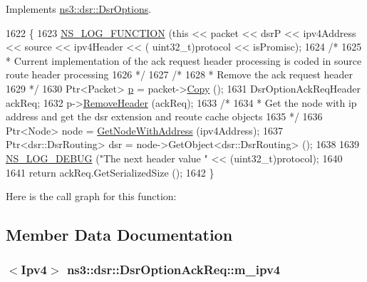 Implements \hyperlink{classns3_1_1dsr_1_1DsrOptions_ac34fb87a95464f3ea9d82ad12253a5cc}{ns3\+::dsr\+::\+Dsr\+Options}.


\begin{DoxyCode}
1622 \{
1623   \hyperlink{log-macros-disabled_8h_a90b90d5bad1f39cb1b64923ea94c0761}{NS\_LOG\_FUNCTION} (\textcolor{keyword}{this} << packet << dsrP << ipv4Address << source << ipv4Header << (
      uint32\_t)protocol << isPromisc);
1624   \textcolor{comment}{/*}
1625 \textcolor{comment}{   * Current implementation of the ack request header processing is coded in source route header processing}
1626 \textcolor{comment}{   */}
1627   \textcolor{comment}{/*}
1628 \textcolor{comment}{   * Remove the ack request header}
1629 \textcolor{comment}{   */}
1630   Ptr<Packet> \hyperlink{lte__link__budget_8m_ac9de518908a968428863f829398a4e62}{p} = packet->\hyperlink{classns3_1_1Packet_a5d5c70802a5f77fc5f0001e0cfc1898b}{Copy} ();
1631   DsrOptionAckReqHeader ackReq;
1632   p->\hyperlink{classns3_1_1Packet_a0961eccf975d75f902d40956c93ba63e}{RemoveHeader} (ackReq);
1633   \textcolor{comment}{/*}
1634 \textcolor{comment}{   * Get the node with ip address and get the dsr extension and reoute cache objects}
1635 \textcolor{comment}{   */}
1636   Ptr<Node> node = \hyperlink{classns3_1_1dsr_1_1DsrOptions_a1a91f820f3d754a477a54bad547ca659}{GetNodeWithAddress} (ipv4Address);
1637   Ptr<dsr::DsrRouting> dsr = node->GetObject<dsr::DsrRouting> ();
1638 
1639   \hyperlink{group__logging_ga413f1886406d49f59a6a0a89b77b4d0a}{NS\_LOG\_DEBUG} (\textcolor{stringliteral}{"The next header value "} << (uint32\_t)protocol);
1640 
1641   \textcolor{keywordflow}{return} ackReq.GetSerializedSize ();
1642 \}
\end{DoxyCode}


Here is the call graph for this function\+:




\subsection{Member Data Documentation}
\subsubsection[{\texorpdfstring{m\+\_\+ipv4}{m_ipv4}}]{$<${\bf Ipv4}$>$ ns3\+::dsr\+::\+Dsr\+Option\+Ack\+Req\+::m\+\_\+ipv4\hspace{0.3cm}{\ttfamily [private]}}\hypertarget{classns3_1_1dsr_1_1DsrOptionAckReq_a8660a574e62855c72c0a4fa6b60bfc56}{}\label{classns3_1_1dsr_1_1DsrOptionAckReq_a8660a574e62855c72c0a4fa6b60bfc56}


